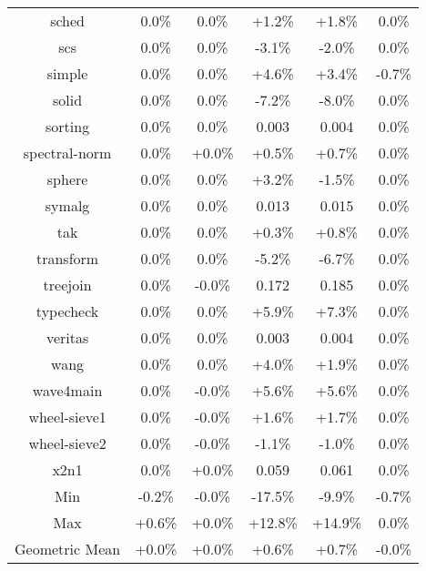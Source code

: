\begin{tabular}{ c c c c c c }
sched &  0.0\% &  0.0\% & +1.2\% & +1.8\% &  0.0\%\\
scs &  0.0\% &  0.0\% & -3.1\% & -2.0\% &  0.0\%\\
simple &  0.0\% &  0.0\% & +4.6\% & +3.4\% & -0.7\%\\
solid &  0.0\% &  0.0\% & -7.2\% & -8.0\% &  0.0\%\\
sorting &  0.0\% &  0.0\% & 0.003 & 0.004 &  0.0\%\\
spectral-norm &  0.0\% & +0.0\% & +0.5\% & +0.7\% &  0.0\%\\
sphere &  0.0\% &  0.0\% & +3.2\% & -1.5\% &  0.0\%\\
symalg &  0.0\% &  0.0\% & 0.013 & 0.015 &  0.0\%\\
tak &  0.0\% &  0.0\% & +0.3\% & +0.8\% &  0.0\%\\
transform &  0.0\% &  0.0\% & -5.2\% & -6.7\% &  0.0\%\\
treejoin &  0.0\% & -0.0\% & 0.172 & 0.185 &  0.0\%\\
typecheck &  0.0\% &  0.0\% & +5.9\% & +7.3\% &  0.0\%\\
veritas &  0.0\% &  0.0\% & 0.003 & 0.004 &  0.0\%\\
wang &  0.0\% &  0.0\% & +4.0\% & +1.9\% &  0.0\%\\
wave4main &  0.0\% & -0.0\% & +5.6\% & +5.6\% &  0.0\%\\
wheel-sieve1 &  0.0\% & -0.0\% & +1.6\% & +1.7\% &  0.0\%\\
wheel-sieve2 &  0.0\% & -0.0\% & -1.1\% & -1.0\% &  0.0\%\\
x2n1 &  0.0\% & +0.0\% & 0.059 & 0.061 &  0.0\%\\
\hline
Min & -0.2\% & -0.0\% & -17.5\% & -9.9\% & -0.7\%\\
Max & +0.6\% & +0.0\% & +12.8\% & +14.9\% &  0.0\%\\
Geometric Mean & +0.0\% & +0.0\% & +0.6\% & +0.7\% & -0.0\%\\


\end{tabular}
